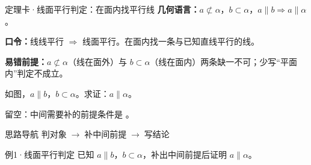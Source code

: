 \documentclass{exam-zh}
\begin{document}
\begin{eduSolutionBox}{定理卡·线面平行判定：在面内找平行线}
  \begingroup
  \setlength{\parskip}{2.5mm}
\textbf{几何语言：}$a\not\subset\alpha$，$b\subset\alpha$，$a\parallel b\Rightarrow a\parallel\alpha$。\par
\textbf{口令：}线线平行 $\Rightarrow$ 线面平行。在面内找一条与已知直线平行的线。\par
\textbf{易错前提：}$a\not\subset\alpha$（线在面外）与 $b\subset\alpha$（线在面内）两条缺一不可；少写“平面内”判定不成立。\par
  \endgroup
\end{eduSolutionBox}




\begin{eduProblemBlock}[例1·线面平行判定]
\noindent
\begin{minipage}[t]{\dimexpr\linewidth-70mm-6mm\relax}
\vspace{0pt}
如图，$a\parallel b$，$b\subset\alpha$。求证：$a\parallel\alpha$。
\par\noindent 留空：中间需要补的前提条件是 \underline{\hspace{20mm}}。

\end{minipage}\hfill
\begin{diagramcoltikz}{70mm}{直线 a 在平面外、b 在平面内，且 a 与 b 平行。}
}
\end{diagramcoltikz}
\end{eduProblemBlock}





\begin{eduAuxItem}{思路导航}
判对象$\;\to\;$补中间前提$\;\to\;$写结论\end{eduAuxItem}




\begin{eduSubQuestionItem}{例1·线面平行判定}
已知 $a\parallel b$，$b\subset\alpha$，补出中间前提后证明 $a\parallel\alpha$。\end{eduSubQuestionItem}
\end{document}
